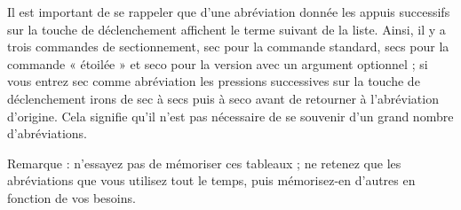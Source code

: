 \documentclass[11pt,french]{article}
\newcommand{\cmd}[1]{\textsf{#1}}
\begin{document}
Il est important de se rappeler que d'une abréviation donnée les appuis successifs sur la touche de déclenchement affichent le terme suivant de la liste. Ainsi, il y a trois commandes de sectionnement, \cmd{sec} pour la commande standard, \cmd{secs} pour la commande « étoilée » et \cmd{seco} pour la version avec un argument optionnel ; si vous entrez \cmd{sec} comme abréviation les pressions successives sur la touche de déclenchement irons de \cmd{sec} à \cmd{secs} puis à \cmd{seco} avant de retourner à l'abréviation d'origine. Cela signifie qu'il n'est pas nécessaire de se souvenir d'un grand nombre  d'abréviations.

Remarque : n'essayez pas de mémoriser ces tableaux ; ne retenez que les abréviations que vous utilisez tout le temps, puis mémorisez-en d'autres en fonction de vos besoins.
\end{document}
